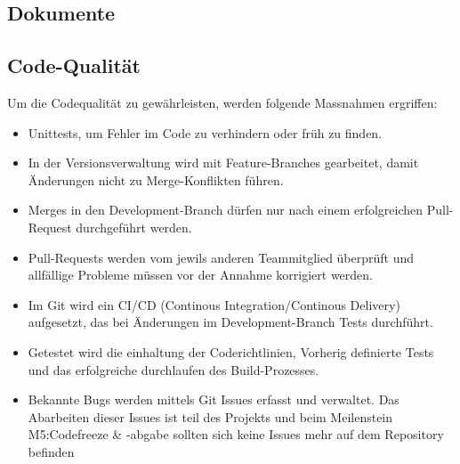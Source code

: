 \documentclass[
	ngerman,
	toc=listof, %
	toc=bibliography, %
	footnotes=multiple, %
	parskip=half, %
	numbers=noendperiod %
]{scrartcl}
\begin{document}
	\subsection{Dokumente}

	\subsection{Code-Qualität}
		Um die Codequalität zu gewährleisten, werden folgende Massnahmen ergriffen:
		\begin{itemize}
			\item Unittests, um Fehler im Code zu verhindern oder früh zu finden.
			\item In der Versionsverwaltung wird mit Feature-Branches gearbeitet, damit Änderungen nicht zu Merge-Konflikten führen.
			\item Merges in den Development-Branch dürfen nur nach einem erfolgreichen Pull-Request durchgeführt werden.
			\item Pull-Requests werden vom jewils anderen Teammitglied überprüft und allfällige Probleme müssen vor der Annahme korrigiert werden.
			\item Im Git wird ein CI/CD (Continous Integration/Continous Delivery) aufgesetzt, das bei Änderungen im Development-Branch Tests durchführt.
			\item Getestet wird die einhaltung der Coderichtlinien, Vorherig definierte Tests und das erfolgreiche durchlaufen des Build-Prozesses.
			\item Bekannte Bugs werden mittels Git Issues erfasst und verwaltet. Das Abarbeiten dieser Issues ist teil des Projekts und beim Meilenstein M5:Codefreeze \& -abgabe sollten sich keine Issues mehr auf dem Repository befinden
		\end{itemize}
\end{document}
